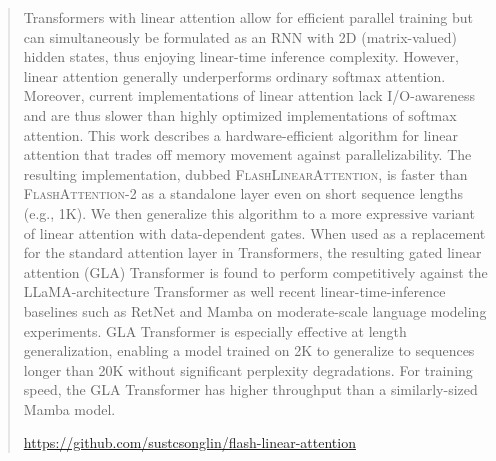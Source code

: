 \documentclass[letterpaper]{article}
\theoremstyle{plain}
\theoremstyle{definition}
\theoremstyle{remark}
\begin{document}
%
\printAffiliationsAndNotice{\icmlEqualContribution} %
%
\vspace{-2mm}
\begin{abstract}
\vspace{-1mm}
Transformers with linear attention allow for efficient parallel training  but can simultaneously  be formulated as an RNN with 2D (matrix-valued) hidden states, thus enjoying  linear-time inference complexity. However, linear attention generally underperforms ordinary softmax attention. Moreover, current implementations of linear attention  lack I/O-awareness and are thus slower than highly optimized implementations of softmax attention. This work  describes a hardware-efficient algorithm for linear attention that trades off memory movement against parallelizability. The resulting implementation, dubbed \textsc{FlashLinearAttention}, is faster than \textsc{FlashAttention-2} \cite{flashattention2} as a standalone layer even on short sequence lengths (e.g., 1K). We then generalize this algorithm to 
 a more expressive variant of linear attention with data-dependent gates. When used as a replacement for the standard attention layer in Transformers, the resulting gated linear attention (GLA) Transformer is found to perform  competitively against the LLaMA-architecture Transformer \citep{touvron2023llama} as well recent linear-time-inference baselines such as RetNet \citep{sun2023retentive} and Mamba \citep{Gu2023MambaLS} on moderate-scale language modeling experiments.  GLA Transformer is especially effective at length generalization, enabling a model trained on 2K  to generalize to sequences longer than 20K without significant perplexity degradations. For training speed, the GLA Transformer has higher throughput than a similarly-sized Mamba model.


\begin{minipage}{\linewidth}

   \faGithub \quad  \url{https://github.com/sustcsonglin/flash-linear-attention}
%
%
\end{minipage}

 
\end{abstract}














%
%
%
%



%



%
%
%
%
%
\newpage
\appendix

\onecolumn
%





%
%
%


%

%
%
%

%
%
%
\end{document}
